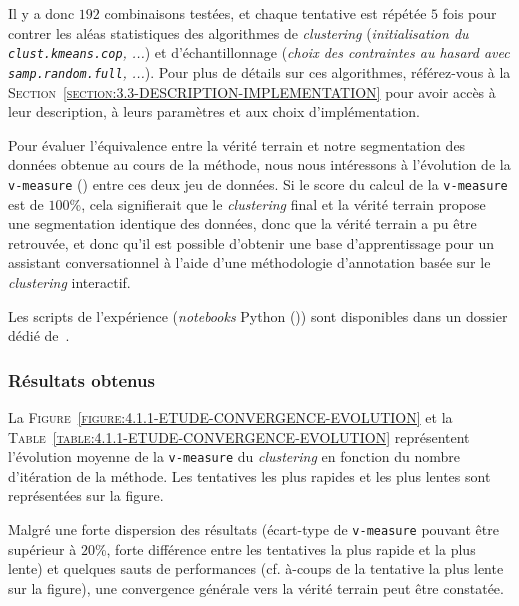 			Il y a donc $192$ combinaisons testées, et chaque tentative est répétée $5$ fois pour contrer les aléas statistiques des algorithmes de \textit{clustering} (\textit{initialisation du \texttt{clust.kmeans.cop}, ...}) et d'échantillonnage (\textit{choix des contraintes au hasard avec \texttt{samp.random.full}, ...}).
			Pour plus de détails sur ces algorithmes, référez-vous à la \textsc{Section~\ref{section:3.3-DESCRIPTION-IMPLEMENTATION}} pour avoir accès à leur description, à leurs paramètres et aux choix d'implémentation.
			
			Pour évaluer l'équivalence entre la vérité terrain et notre segmentation des données obtenue au cours de la méthode, nous nous intéressons à l'évolution de la \texttt{v-measure} (\cite{rosenberg-hirschberg:2007:vmeasure-conditional-entropybased}) entre ces deux jeu de données.
			Si le score du calcul de la \texttt{v-measure} est de $100$\%, cela signifierait que le \textit{clustering} final et la vérité terrain propose une segmentation identique des données, donc que la vérité terrain a pu être retrouvée, et donc qu'il est possible d'obtenir une base d'apprentissage pour un assistant conversationnel à l'aide d'une méthodologie d'annotation basée sur le \textit{clustering} interactif.
			
			\begin{leftBarInformation}
				Les scripts de l'expérience (\textit{notebooks} Python (\cite{van-rossum-drake:2009:python-reference-manual})) sont disponibles dans un dossier dédié de~\cite{schild:2021:cognitivefactory-interactiveclusteringcomparativestudy}.
			\end{leftBarInformation}

		\subsubsection{Résultats obtenus}
			
			La \textsc{Figure~\ref{figure:4.1.1-ETUDE-CONVERGENCE-EVOLUTION}} et la \textsc{Table~\ref{table:4.1.1-ETUDE-CONVERGENCE-EVOLUTION}} représentent l'évolution moyenne de la \texttt{v-measure} du \textit{clustering} en fonction du nombre d'itération de la méthode. Les tentatives les plus rapides et les plus lentes sont représentées sur la figure.
							
			Malgré une forte dispersion des résultats (écart-type de \texttt{v-measure} pouvant être supérieur à $20$\%, forte différence entre les tentatives la plus rapide et la plus lente) et quelques sauts de performances (cf. à-coups de la tentative la plus lente sur la figure), une convergence générale vers la vérité terrain peut être constatée.
			
